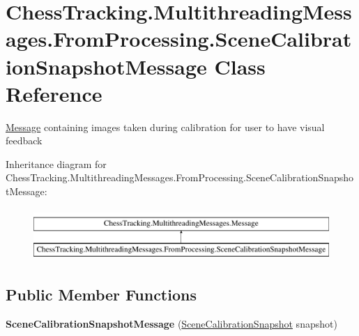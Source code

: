 \hypertarget{class_chess_tracking_1_1_multithreading_messages_1_1_from_processing_1_1_scene_calibration_snapshot_message}{}\section{Chess\+Tracking.\+Multithreading\+Messages.\+From\+Processing.\+Scene\+Calibration\+Snapshot\+Message Class Reference}
\label{class_chess_tracking_1_1_multithreading_messages_1_1_from_processing_1_1_scene_calibration_snapshot_message}


\mbox{\hyperlink{class_chess_tracking_1_1_multithreading_messages_1_1_message}{Message}} containing images taken during calibration for user to have visual feedback  


Inheritance diagram for Chess\+Tracking.\+Multithreading\+Messages.\+From\+Processing.\+Scene\+Calibration\+Snapshot\+Message\+:\begin{figure}[H]
\begin{center}
\leavevmode
\includegraphics[height=2.000000cm]{class_chess_tracking_1_1_multithreading_messages_1_1_from_processing_1_1_scene_calibration_snapshot_message}
\end{center}
\end{figure}
\subsection*{Public Member Functions}
\begin{DoxyCompactItemize}
\item 
\mbox{\label{class_chess_tracking_1_1_multithreading_messages_1_1_from_processing_1_1_scene_calibration_snapshot_message_a21b6b053b5af853760ca39dea5f15996}} 
{\bfseries Scene\+Calibration\+Snapshot\+Message} (\mbox{\hyperlink{class_chess_tracking_1_1_image_processing_1_1_pipeline_data_1_1_scene_calibration_snapshot}{Scene\+Calibration\+Snapshot}} snapshot)
\end{DoxyCompactItemize}

